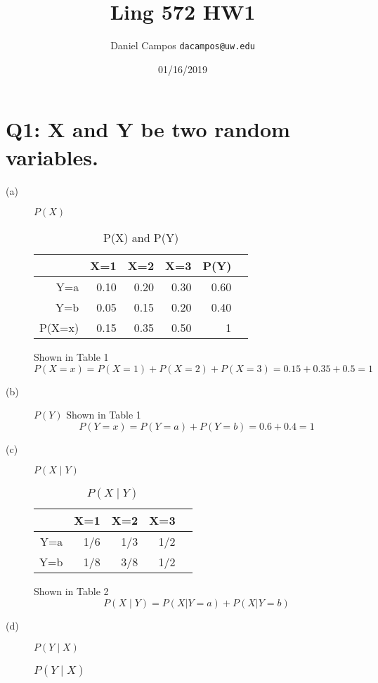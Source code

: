 \documentclass[11pt]{article}
\begin{document}
\title{Ling 572 HW1 }
\author{Daniel Campos  \tt {dacampos@uw.edu}}
\date{01/16/2019}
\maketitle 
\section{ Q1: X and Y be two random variables.}
  \begin{description}
   \item [(a)]$P(X)$
\begin{table}
\label{q1-table1}
\centering
\caption{P(X) and P(Y)}
\begin{tabular}{|r|r|r|r|r|r|}  \hline
    & X=1 & X=2 & X=3 & P(Y) \\ \hline
Y=a & 0.10 & 0.20 &  0.30 & 0.60 \\ \hline 
Y=b & 0.05 & 0.15 &  0.20 &0.40 \\ \hline
P(X=x) & 0.15 & 0.35 & 0.50 & 1 \\ \hline
\end{tabular}
\end{table}
    Shown in Table 1
    \begin{equation}
     P(X=x) = P(X=1) + P(X=2) + P(X=3) = 0.15 + 0.35 + 0.5 = 1
    \end{equation}
   \item [(b)]$P(Y)$
    Shown in Table 1
    \begin{equation}
      P(Y=x) = P(Y=a) + P(Y=b) = 0.6 + 0.4 = 1
    \end{equation}
   \item [(c)]$P(X \mid Y)$
\begin{table}
\label{q1-table2}
\centering
\caption{$P(X \mid Y)$}
\begin{tabular}{|r|r|r|r|r|}  \hline
    & X=1 & X=2 & X=3 \\ \hline
Y=a & 1/6 & 1/3 &  1/2 \\ \hline 
Y=b & 1/8 & 3/8 &  1/2 \\ \hline
\end{tabular}
\end{table}
     Shown in Table 2
    \begin{equation}
      P(X \mid Y) = P(X | Y=a) + P(X | Y=b)
    \end{equation}
   \item [(d)]$P(Y \mid X)$
\begin{table}
\label{q1-table3}
\centering
\caption{$P(Y \mid X)$}
\begin{tabular}{|r|r|r|r|r|}  \hline

\end{tabular}
\end{table}
\end{description}
\end{document}
